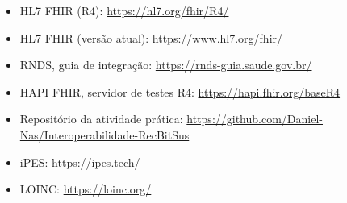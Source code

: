 \documentclass[11pt,a4paper]{article}
\begin{document}
\begin{itemize}
  \item HL7 FHIR (R4): \url{https://hl7.org/fhir/R4/}
  \item HL7 FHIR (versão atual): \url{https://www.hl7.org/fhir/}
  \item RNDS, guia de integração: \url{https://rnds-guia.saude.gov.br/}
  \item HAPI FHIR, servidor de testes R4: \url{https://hapi.fhir.org/baseR4}
  \item Repositório da atividade prática:
    \url{https://github.com/Daniel-Nas/Interoperabilidade-RecBitSus}
  \item iPES: \url{https://ipes.tech/}
  \item LOINC: \url{https://loinc.org/}
\end{itemize}
\end{document}
